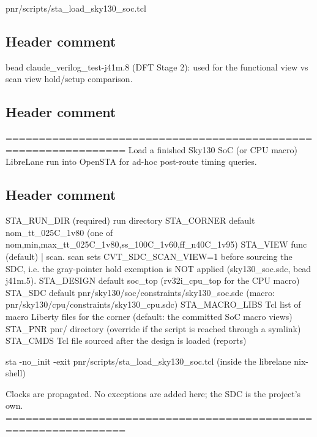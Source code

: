 \begin{relocated}{pnr/scripts/sta_load_sky130_soc.tcl}

\subsection*{Header comment}

\begin{textblock}
bead claude_verilog_test-j41m.8 (DFT Stage 2): used for the functional view vs scan view hold/setup comparison.
\end{textblock}

\subsection*{Header comment}

\begin{textblock}
================================================================
Load a finished Sky130 SoC (or CPU macro) LibreLane run into OpenSTA for ad-hoc post-route timing queries.
\end{textblock}

\subsection*{Header comment}

\begin{textblock}

  STA_RUN_DIR   (required) run directory
  STA_CORNER    default nom_tt_025C_1v80 (one of {nom,min,max}_{tt_025C_1v80,ss_100C_1v60,ff_n40C_1v95})
  STA_VIEW      func (default) | scan.  scan sets CVT_SDC_SCAN_VIEW=1 before sourcing the SDC, i.e. the gray-pointer
                hold exemption is NOT applied (sky130_soc.sdc, bead j41m.5).
  STA_DESIGN    default soc_top  (rv32i_cpu_top for the CPU macro)
  STA_SDC       default pnr/sky130/soc/constraints/sky130_soc.sdc (macro: pnr/sky130/cpu/constraints/sky130_cpu.sdc)
  STA_MACRO_LIBS  Tcl list of macro Liberty files for the corner (default: the committed SoC macro views)
  STA_PNR       pnr/ directory (override if the script is reached through a symlink)
  STA_CMDS      Tcl file sourced after the design is loaded (reports)

  sta -no_init -exit pnr/scripts/sta_load_sky130_soc.tcl      (inside the librelane nix-shell)

Clocks are propagated. No exceptions are added here; the SDC is the project's own.
================================================================
\end{textblock}

\end{relocated}

